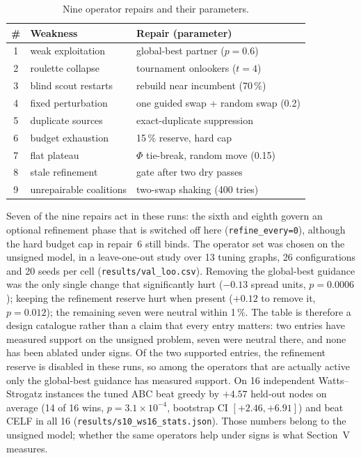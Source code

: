 \documentclass[journal,letterpaper,10pt]{IEEEtran}
\begin{document}
\begin{table}[!t]
\centering
\caption{Nine operator repairs and their parameters.}
\label{tab:ops}
\footnotesize
\setlength{\tabcolsep}{2.5pt}
\begin{tabular}{@{}clp{4.5cm}@{}}
\toprule
\# & Weakness & Repair (parameter)\\
\midrule
1 & weak exploitation & global-best partner ($p=0.6$)\\
2 & roulette collapse & tournament onlookers ($t=4$)\\
3 & blind scout restarts & rebuild near incumbent (70\,\%)\\
4 & fixed perturbation & one guided swap + random swap (0.2)\\
5 & duplicate sources & exact-duplicate suppression\\
6 & budget exhaustion & 15\,\% reserve, hard cap\\
7 & flat plateau & $\Phi$ tie-break, random move (0.15)\\
8 & stale refinement & gate after two dry passes\\
9 & unrepairable coalitions & two-swap shaking (400 tries)\\
\bottomrule
\end{tabular}
\end{table}

Seven of the nine repairs act in these runs: the sixth and eighth govern an optional refinement phase that is switched off here (\texttt{refine\_every=0}), although the hard budget cap in repair~6 still binds. The operator set was chosen on the unsigned model, in a leave-one-out study over 13 tuning graphs, 26 configurations and 20 seeds per cell (\texttt{results/val\_loo.csv}). Removing the global-best guidance was the only single change that significantly hurt ($-0.13$ spread units, $p=0.0006$); keeping the refinement reserve hurt when present ($+0.12$ to remove it, $p=0.012$); the remaining seven were neutral within 1\,\%. The table is therefore a design catalogue rather than a claim that every entry matters: two entries have measured support on the unsigned problem, seven were neutral there, and none has been ablated under signs. Of the two supported entries, the refinement reserve is disabled in these runs, so among the operators that are actually active only the global-best guidance has measured support. On 16 independent Watts--Strogatz instances the tuned ABC beat greedy by $+4.57$ held-out nodes on average (14 of 16 wins, $p=3.1\times10^{-4}$, bootstrap CI $[+2.46,+6.91]$) and beat CELF in all 16 (\texttt{results/s10\_ws16\_stats.json}). Those numbers belong to the unsigned model; whether the same operators help under signs is what Section~V measures.
\end{document}
